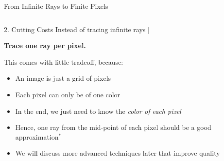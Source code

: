 \begin{frame}{From Infinite Rays to Finite Pixels}
    \begin{columns}
        \begin{column}{0.6\textwidth}
            \begin{raybox}{2. Cutting Costs}
                Instead of tracing infinite rays |

                \vspace{0.1cm}
                \textbf{Trace one ray per pixel.}
            \end{raybox}
            \vspace{0.3cm}
            This comes with little tradeoff, because:
            \begin{itemize}
                \small
                \item<2-> An image is just a grid of pixels
                \item<3-> Each pixel can only be of one color
                \item<4-> In the end, we just need to know the \emph{color of each pixel}
                \item<5-> Hence, one ray from the mid-point of each pixel should be a good approximation$^*$ \\                 
            \end{itemize}
            \vspace{0.3cm}
            \begin{itemize}
                \footnotesize
                \item<5->[$^*$] We will discuss more advanced techniques later that improve quality
            \end{itemize}
        \end{column}
        \begin{column}{0.4\textwidth}
            \centering
            \pause
\end{column}
\end{columns}
\end{frame}

